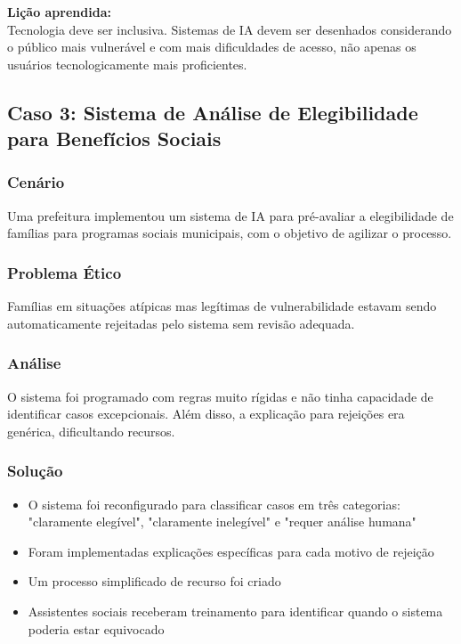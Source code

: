 \documentclass[12pt,a4paper]{article}
\begin{document}
\begin{tcolorbox}[highlight]
\textbf{Lição aprendida:} \\
Tecnologia deve ser inclusiva. Sistemas de IA devem ser desenhados considerando o público mais vulnerável e com mais dificuldades de acesso, não apenas os usuários tecnologicamente mais proficientes.
\end{tcolorbox}

\subsection{Caso 3: Sistema de Análise de Elegibilidade para Benefícios Sociais}

\subsubsection{Cenário}
Uma prefeitura implementou um sistema de IA para pré-avaliar a elegibilidade de famílias para programas sociais municipais, com o objetivo de agilizar o processo.

\subsubsection{Problema Ético}
Famílias em situações atípicas mas legítimas de vulnerabilidade estavam sendo automaticamente rejeitadas pelo sistema sem revisão adequada.

\subsubsection{Análise}
O sistema foi programado com regras muito rígidas e não tinha capacidade de identificar casos excepcionais. Além disso, a explicação para rejeições era genérica, dificultando recursos.

\subsubsection{Solução}
\begin{itemize}
    \item O sistema foi reconfigurado para classificar casos em três categorias: "claramente elegível", "claramente inelegível" e "requer análise humana"
    \item Foram implementadas explicações específicas para cada motivo de rejeição
    \item Um processo simplificado de recurso foi criado
    \item Assistentes sociais receberam treinamento para identificar quando o sistema poderia estar equivocado
\end{itemize}
\end{document}
